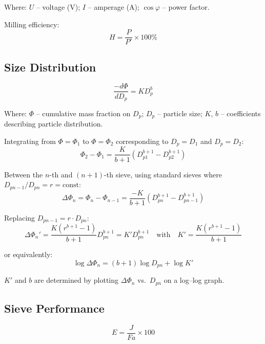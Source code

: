 Where: $U$ -- voltage (V); $I$ -- amperage (A); $\cos\varphi$ -- power factor.

Milling efficiency:
\begin{equation}
    H = \frac{P}{P'} \times 100\%
\end{equation}

\subsection{Size Distribution}

\begin{equation}
    \frac{-d\varPhi}{dD_p} = K D_p^b
\end{equation}

Where: $\varPhi$ -- cumulative mass fraction on $D_p$; $D_p$ -- particle size; $K$, $b$ -- coefficients describing particle distribution.

Integrating from $\varPhi = \varPhi_1$ to $\varPhi = \varPhi_2$ corresponding to $D_p = D_1$ and $D_p = D_2$:
\begin{equation}
    \varPhi_2 - \varPhi_1 = \frac{K}{b+1}\left(D_{p1}^{b+1} - D_{p2}^{b+1}\right)
\end{equation}

Between the $n$-th and $(n+1)$-th sieve, using standard sieves where $D_{pn-1}/D_{pn} = r = \text{const}$:
\begin{equation}
    \Delta\varPhi_n = \varPhi_n - \varPhi_{n-1} = \frac{-K}{b+1}\left(D_{pn}^{b+1} - D_{pn-1}^{b+1}\right)
\end{equation}

Replacing $D_{pn-1} = r \cdot D_{pn}$:
\begin{equation}
    \Delta\varPhi_n' = \frac{K(r^{b+1}-1)}{b+1} D_{pn}^{b+1} = K' D_{pn}^{b+1}
    \quad \text{with} \quad K' = \frac{K(r^{b+1}-1)}{b+1}
\end{equation}

or equivalently:
\begin{equation}
    \log\Delta\varPhi_n = (b+1)\log D_{pn} + \log K'
\end{equation}

$K'$ and $b$ are determined by plotting $\Delta\varPhi_n$ vs.\ $D_{pn}$ on a log--log graph.

\subsection{Sieve Performance}

\begin{equation}
    E = \frac{J}{Fa} \times 100
\end{equation}

